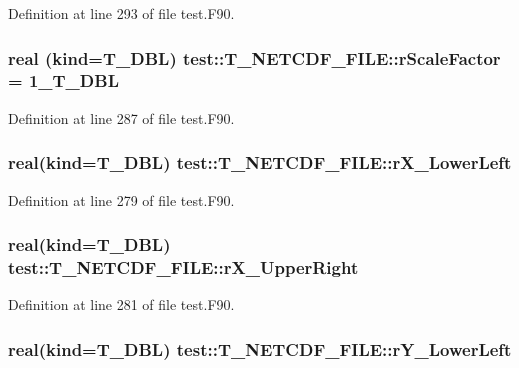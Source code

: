 Definition at line 293 of file test.F90.

\hypertarget{typetest_1_1_t___n_e_t_c_d_f___f_i_l_e_aea57fe5655c5b890069d8de257478b08}{
\subsubsection[{rScaleFactor}]{\setlength{\rightskip}{0pt plus 5cm}real (kind={\bf T\_\-DBL}) {\bf test::T\_\-NETCDF\_\-FILE::rScaleFactor} = 1\_\-T\_\-DBL}}
\label{typetest_1_1_t___n_e_t_c_d_f___f_i_l_e_aea57fe5655c5b890069d8de257478b08}


Definition at line 287 of file test.F90.

\hypertarget{typetest_1_1_t___n_e_t_c_d_f___f_i_l_e_a8a947c9e0f4b056fe7e6582dc244532b}{
\subsubsection[{rX\_\-LowerLeft}]{\setlength{\rightskip}{0pt plus 5cm}real(kind={\bf T\_\-DBL}) {\bf test::T\_\-NETCDF\_\-FILE::rX\_\-LowerLeft}}}
\label{typetest_1_1_t___n_e_t_c_d_f___f_i_l_e_a8a947c9e0f4b056fe7e6582dc244532b}


Definition at line 279 of file test.F90.

\hypertarget{typetest_1_1_t___n_e_t_c_d_f___f_i_l_e_a494e23d00a4799d39a314f927ce58e03}{
\subsubsection[{rX\_\-UpperRight}]{\setlength{\rightskip}{0pt plus 5cm}real(kind={\bf T\_\-DBL}) {\bf test::T\_\-NETCDF\_\-FILE::rX\_\-UpperRight}}}
\label{typetest_1_1_t___n_e_t_c_d_f___f_i_l_e_a494e23d00a4799d39a314f927ce58e03}


Definition at line 281 of file test.F90.

\hypertarget{typetest_1_1_t___n_e_t_c_d_f___f_i_l_e_a6e2124ccfedaaaf807326d4ad3de3048}{
\subsubsection[{rY\_\-LowerLeft}]{\setlength{\rightskip}{0pt plus 5cm}real(kind={\bf T\_\-DBL}) {\bf test::T\_\-NETCDF\_\-FILE::rY\_\-LowerLeft}}}
\label{typetest_1_1_t___n_e_t_c_d_f___f_i_l_e_a6e2124ccfedaaaf807326d4ad3de3048}


